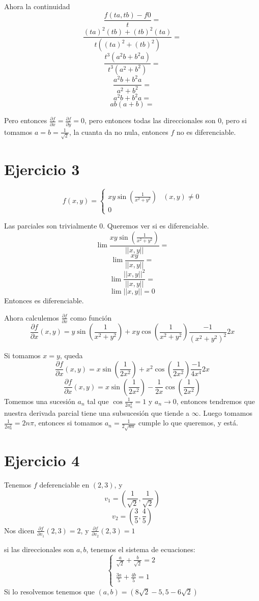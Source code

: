 \documentclass{article}
\begin{document}
Ahora la continuidad
\[\frac{f(ta, tb) - f0}{t}=\]
\[\frac{(ta)^2(tb)+(tb)^2(ta)}{t((ta)^2+(tb)^2)}=\]
\[\frac{t^3(a^2b+b^2a)}{t^3(a^2+b^2)}=\]
\[\frac{a^2b+b^2a}{a^2+b^2}=\]
\[a^2b+b^2a=\]
\[ab(a+b)=\]

Pero entonces $\frac{\partial f}{\partial x} = \frac{\partial f}{\partial y} = 0$, pero entonces todas las direccionales son $0$, pero si tomamos $a = b= \frac{1}{\sqrt{2}}$, la cuanta da no nula, entonces $f$ no es diferenciable.

\section*{Ejercicio 3}
\[
	f(x,y) =
	\begin{cases}
		xy\sin\left(\frac{1}{x^2+y^2} \right) & (x,y) \neq 0 \\
		0
	\end{cases}
\]

Las parciales son trivialmente $0$. Queremos ver si es diferenciable.
\[\lim\frac{xy\sin\left(\frac{1}{x^2+y^2} \right)}{||x,y||}=\]
\[\lim\frac{xy}{||x,y||}=\]
\[\lim\frac{||x,y||^2}{||x,y||}=\]
\[\lim||x,y|| = 0\]
Entonces es diferenciable.

Ahora calculemos $\frac{\partial f}{\partial x} $ como función
\[\frac{\partial f}{\partial x}(x,y) = y\sin \left(\frac{1}{x^2+y^2}\right) + xy\cos \left(\frac{1}{x^2+y^2}\right)\frac{-1}{(x^2+y^2)^2}2x\]

Si tomamos $x = y$, queda
\[\frac{\partial f}{\partial x}(x,y) = x\sin \left(\frac{1}{2x^2}\right) + x^2\cos \left(\frac{1}{2x^2}\right)\frac{-1}{4x^4}2x\]
\[\frac{\partial f}{\partial x}(x,y) = x\sin \left(\frac{1}{2x^2}\right) - \frac{1}{2x}\cos \left(\frac{1}{2x^2}\right)\]
Tomemos una sucesión $a_n$ tal que $\cos\frac{1}{2a_n^2} = 1$ y $a_n \to 0$, entonces tendremos que nuestra derivada parcial tiene una subsucesión que tiende a $\infty$. Luego tomamos $\frac{1}{2a_n^2} = 2n\pi$, entonces si tomamos $a_n = \frac{1}{2\sqrt{n\pi}}$ cumple lo que queremos, y está.

\section*{Ejercicio 4}
Tenemos $f$ deferenciable en $(2,3)$, y
\[v_1 = \left(\frac{1}{\sqrt{2}} , \frac{1}{\sqrt{2}} \right)\]
\[v_2 = \left(\frac{3}{5} , \frac{4}{5} \right)\]
Nos dicen $\frac{\partial f}{\partial v_1}(2,3) = 2$, y $\frac{\partial f}{\partial v_2} (2,3) = 1$

si las direccionales son $a, b$, tenemos el sistema de ecuaciones:
\[
\begin{cases}
	\frac{a}{\sqrt{2}} + \frac{b}{\sqrt{2}} = 2 \\
	\\
	\frac{3a}{5} + \frac{4b}{5} = 1 \\
\end{cases}\]
Si lo resolvemos tenemos que $(a,b) = (8\sqrt{2} - 5, 5-6\sqrt{2})$
\end{document}
